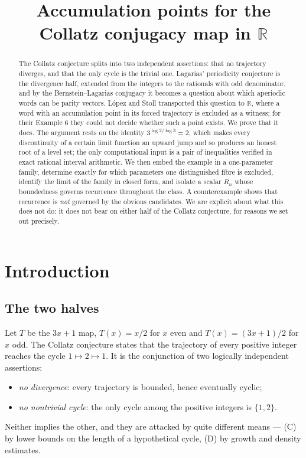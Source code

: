 \documentclass[11pt,a4paper]{article}
\title{Accumulation points for the Collatz conjugacy map in $\mathbb{R}$}
\author{}
\date{}
\theoremstyle{plain}
\theoremstyle{definition}
\newcommand{\R}{\mathbb{R}}
\begin{document}
\maketitle

\begin{abstract}
The Collatz conjecture splits into two independent assertions: that no trajectory diverges, and
that the only cycle is the trivial one. Lagarias' periodicity conjecture is the divergence half,
extended from the integers to the rationals with odd denominator, and by the Bernstein--Lagarias
conjugacy it becomes a question about which aperiodic words can be parity vectors. L\'opez and
Stoll transported this question to $\R$, where a word with an accumulation point in its forced
trajectory is excluded as a witness; for their Example 6 they could not decide whether such a point
exists. We prove that it does. The argument rests on the identity $3^{\log2/\log3}=2$, which makes
every discontinuity of a certain limit function an upward jump and so produces an honest root of a
level set; the only computational input is a pair of inequalities verified in exact rational
interval arithmetic. We then embed the example in a one-parameter family, determine exactly for
which parameters one distinguished fibre is excluded, identify the limit of the family in closed
form, and isolate a scalar $R_n$ whose boundedness governs recurrence throughout the class. A
counterexample shows that recurrence is \emph{not} governed by the obvious candidates. We are
explicit about what this does not do: it does not bear on either half of the Collatz conjecture,
for reasons we set out precisely.
\end{abstract}

\section{Introduction}

\subsection*{The two halves}

Let $T$ be the $3x+1$ map, $T(x)=x/2$ for $x$ even and $T(x)=(3x+1)/2$ for $x$ odd. The Collatz
conjecture states that the trajectory of every positive integer reaches the cycle $1\mapsto2\mapsto1$.
It is the conjunction of two logically independent assertions:
\begin{itemize}
\item[(D)] \emph{no divergence}: every trajectory is bounded, hence eventually cyclic;
\item[(C)] \emph{no nontrivial cycle}: the only cycle among the positive integers is $\{1,2\}$.
\end{itemize}
Neither implies the other, and they are attacked by quite different means --- (C) by lower bounds on
the length of a hypothetical cycle, (D) by growth and density estimates.
\end{document}
